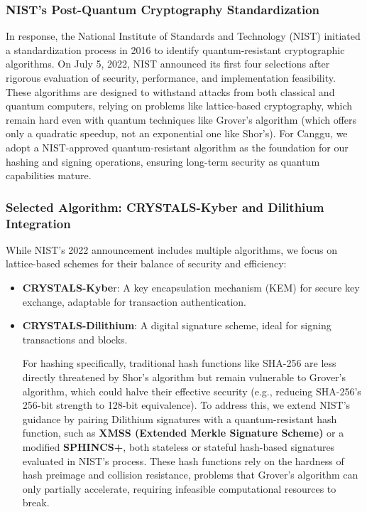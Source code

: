 \documentclass[12pt]{article}
\begin{document}
\subsubsection{NIST’s Post-Quantum Cryptography Standardization}

\begin{justify}
    In response, the National Institute of Standards and Technology (NIST) initiated a standardization process in 2016 to identify quantum-resistant cryptographic algorithms. On July 5, 2022, NIST announced its first four selections after rigorous evaluation of security, performance, and implementation feasibility. These algorithms are designed to withstand attacks from both classical and quantum computers, relying on problems like lattice-based cryptography, which remain hard even with quantum techniques like Grover’s algorithm (which offers only a quadratic speedup, not an exponential one like Shor’s).
For Canggu, we adopt a NIST-approved quantum-resistant algorithm as the foundation for our hashing and signing operations, ensuring long-term security as quantum capabilities mature.

\end{justify}

\subsubsection{Selected Algorithm: CRYSTALS-Kyber and Dilithium Integration}
\begin{justify}
While NIST’s 2022 announcement includes multiple algorithms, we focus on lattice-based schemes for their balance of security and efficiency:

\begin{itemize}
    \item \textbf{CRYSTALS-Kybe}r: A key encapsulation mechanism (KEM) for secure key exchange, adaptable for transaction authentication.
    \item \textbf{CRYSTALS-Dilithium}: A digital signature scheme, ideal for signing transactions and blocks.

    For hashing specifically, traditional hash functions like SHA-256 are less directly threatened by Shor’s algorithm but remain vulnerable to Grover’s algorithm, which could halve their effective security (e.g., reducing SHA-256’s 256-bit strength to 128-bit equivalence). To address this, we extend NIST’s guidance by pairing Dilithium signatures with a quantum-resistant hash function, such as \textbf{XMSS (Extended Merkle Signature Scheme)} or a modified \textbf{SPHINCS+}, both stateless or stateful hash-based signatures evaluated in NIST’s process. These hash functions rely on the hardness of hash preimage and collision resistance, problems that Grover’s algorithm can only partially accelerate, requiring infeasible computational resources to break.
\end{itemize}
\end{justify}
\end{document}
